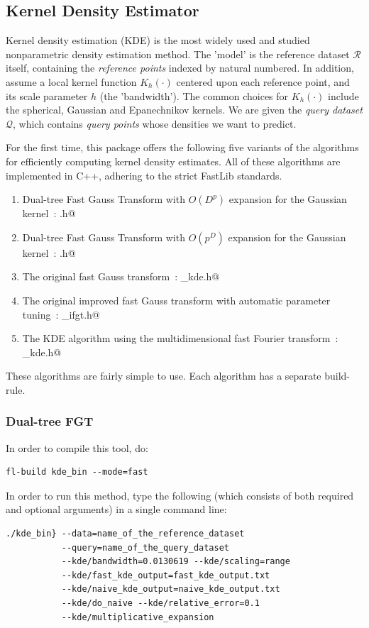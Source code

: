 \documentclass[letter]{report}
\begin{document}
\subsection{Kernel Density Estimator}
Kernel density estimation (KDE) is the most widely used and studied nonparametric density estimation method. The 'model' is the reference dataset $\mathcal{R}$ itself, containing the {\it reference points}
indexed by natural numbered. In addition, assume a local kernel function $K_h(\cdot)$ centered upon each reference point, and its scale parameter $h$ (the 'bandwidth'). The common choices for $K_h(\cdot)$ include the spherical, Gaussian and Epanechnikov kernels. We are given the {\it query dataset} $\mathcal{Q}$, which contains {\it query points} whose densities we want to predict.

For the first time, this package offers the following five variants of
the algorithms for efficiently computing kernel density estimates. All
of these algorithms are implemented in C++, adhering to the strict
FastLib standards.

\begin{enumerate}
\item{Dual-tree Fast Gauss Transform with $O(D^p)$ expansion for the
Gaussian kernel~\cite{LEE06}: \verb@kde.h@}
\item{Dual-tree Fast Gauss Transform with $O(p^D)$ expansion for the
Gaussian kernel~\cite{LEE05}: \verb@kde.h@}
\item{The original fast Gauss transform~\cite{ggstrain}: \verb@fgt_kde.h@}
\item{The original improved fast Gauss transform with automatic
parameter tuning~\cite{YANG03}: \verb@original_ifgt.h@}
\item{The KDE algorithm using the multidimensional fast Fourier
transform~\cite{wand94}: \verb@fft_kde.h@}
\end{enumerate}

These algorithms are fairly simple to use. Each algorithm has a
separate build-rule.
\subsubsection{Dual-tree FGT}
In order to compile this tool, do: 
\begin{verbatim}
fl-build kde_bin --mode=fast
\end{verbatim}

In order to run this method, type the following (which consists of
both required and optional arguments) in a single command line:
\begin{verbatim}
./kde_bin} --data=name_of_the_reference_dataset
           --query=name_of_the_query_dataset
           --kde/bandwidth=0.0130619 --kde/scaling=range
           --kde/fast_kde_output=fast_kde_output.txt
           --kde/naive_kde_output=naive_kde_output.txt
           --kde/do_naive --kde/relative_error=0.1
           --kde/multiplicative_expansion
\end{verbatim}
\end{document}
